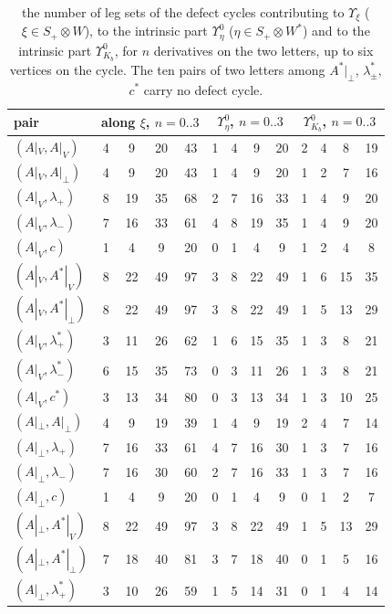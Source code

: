\documentclass[11pt]{article}
\numberwithin{equation}{section}
\theoremstyle{plain}
\theoremstyle{definition}
\begin{document}
\begin{longtable}{l|cccc|cccc|cccc}
\caption{the number of leg sets of the defect cycles contributing to $\Upsilon_\xi$ ($\xi\in S_+\otimes W$), to the intrinsic part $\Upsilon^0_\eta$ ($\eta\in S_+\otimes W^*$) and to the intrinsic part $\Upsilon^0_{K_b}$, for $n$ derivatives on the two letters, up to six vertices on the cycle. The ten pairs of two letters among $A^*|_\perp$, $\lambda^*_\pm$, $c^*$ carry no defect cycle.}\label{tab:qs-counts}\\
pair & \multicolumn{4}{c|}{along $\xi$, $n=0..3$} & \multicolumn{4}{c|}{$\Upsilon^0_\eta$, $n=0..3$} & \multicolumn{4}{c}{$\Upsilon^0_{K_b}$, $n=0..3$}\\
\hline
$(A|_V,A|_V)$ & 4 & 9 & 20 & 43 & 1 & 4 & 9 & 20 & 2 & 4 & 8 & 19\\
$(A|_V,A|_\perp)$ & 4 & 9 & 20 & 43 & 1 & 4 & 9 & 20 & 1 & 2 & 7 & 16\\
$(A|_V,\lambda_+)$ & 8 & 19 & 35 & 68 & 2 & 7 & 16 & 33 & 1 & 4 & 9 & 20\\
$(A|_V,\lambda_-)$ & 7 & 16 & 33 & 61 & 4 & 8 & 19 & 35 & 1 & 4 & 9 & 20\\
$(A|_V,c)$ & 1 & 4 & 9 & 20 & 0 & 1 & 4 & 9 & 1 & 2 & 4 & 8\\
$(A|_V,A^*|_V)$ & 8 & 22 & 49 & 97 & 3 & 8 & 22 & 49 & 1 & 6 & 15 & 35\\
$(A|_V,A^*|_\perp)$ & 8 & 22 & 49 & 97 & 3 & 8 & 22 & 49 & 1 & 5 & 13 & 29\\
$(A|_V,\lambda^*_+)$ & 3 & 11 & 26 & 62 & 1 & 6 & 15 & 35 & 1 & 3 & 8 & 21\\
$(A|_V,\lambda^*_-)$ & 6 & 15 & 35 & 73 & 0 & 3 & 11 & 26 & 1 & 3 & 8 & 21\\
$(A|_V,c^*)$ & 3 & 13 & 34 & 80 & 0 & 3 & 13 & 34 & 1 & 3 & 10 & 25\\
$(A|_\perp,A|_\perp)$ & 4 & 9 & 19 & 39 & 1 & 4 & 9 & 19 & 2 & 4 & 7 & 14\\
$(A|_\perp,\lambda_+)$ & 7 & 16 & 33 & 61 & 4 & 7 & 16 & 30 & 1 & 3 & 7 & 16\\
$(A|_\perp,\lambda_-)$ & 7 & 16 & 30 & 60 & 2 & 7 & 16 & 33 & 1 & 3 & 7 & 16\\
$(A|_\perp,c)$ & 1 & 4 & 9 & 20 & 0 & 1 & 4 & 9 & 0 & 1 & 2 & 7\\
$(A|_\perp,A^*|_V)$ & 8 & 22 & 49 & 97 & 3 & 8 & 22 & 49 & 1 & 5 & 13 & 29\\
$(A|_\perp,A^*|_\perp)$ & 7 & 18 & 40 & 81 & 3 & 7 & 18 & 40 & 0 & 1 & 5 & 16\\
$(A|_\perp,\lambda^*_+)$ & 3 & 10 & 26 & 59 & 1 & 5 & 14 & 31 & 0 & 1 & 4 & 14\\

\end{longtable}
\end{document}
